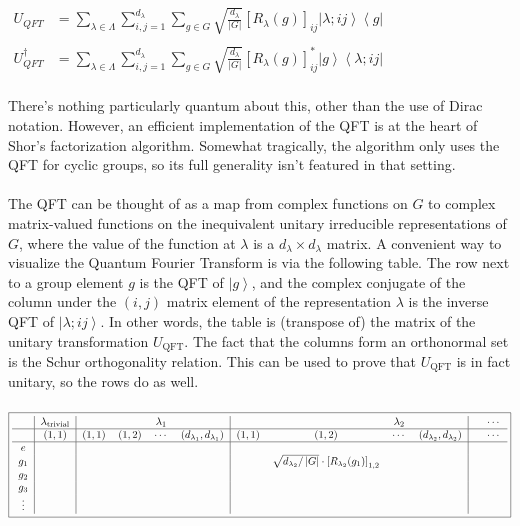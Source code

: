 \documentclass[]{article}
\begin{document}
\\
$\begin{aligned}
U_{QFT}&=\sum_{\lambda\in\Lambda}\sum_{i,j=1}^{d_\lambda}\sum_{g\in G}\sqrt{\frac{d_\lambda}{\left\vert G\right\vert}}\left[R_\lambda(g)\right]_{ij}\left\vert\lambda;ij\right\rangle\left\langle g\right\vert\\
\\
U_{QFT}^\dagger&=\sum_{\lambda\in\Lambda}\sum_{i,j=1}^{d_\lambda}\sum_{g\in G}\sqrt{\frac{d_\lambda}{\left\vert G\right\vert}}\left[R_\lambda(g)\right]_{ij}^*\left\vert g\right\rangle\left\langle \lambda;ij\right\vert
\end{aligned}$\\
\\
There's nothing particularly quantum about this, other than the use of Dirac notation. However, an efficient implementation of the QFT is at the heart of Shor's factorization algorithm. Somewhat tragically, the algorithm only uses the QFT for cyclic groups, so its full generality isn't featured in that setting.\\
\\
The QFT can be thought of as a map from complex functions on $G$ to complex matrix-valued functions on the inequivalent unitary irreducible representations of $G$, where the value of the function at $\lambda$ is a $d_\lambda\times d_\lambda$ matrix. A convenient way to visualize the Quantum Fourier Transform is via the following table. The row next to a group element $g$ is the QFT of $\left\vert g\right\rangle$, and the complex conjugate of the column under the $(i,j)$ matrix element of the representation $\lambda$ is the inverse QFT of $\left\vert \lambda;ij\right\rangle$. In other words, the table is (transpose of) the matrix of the unitary transformation $U_\text{QFT}$. The fact that the columns form an orthonormal set is the Schur orthogonality relation. This can be used to prove that $U_\text{QFT}$ is in fact unitary, so the rows do as well.\\
\\	
$\boxed{\begin{tabular}{c|c|cccc|cccc|cc}
 & $\lambda_{\text{trivial}}$ & &&$\lambda_1$ & &&&$\lambda_2$ &&& $\cdots$\\
 \hline
& $(1,1)$ & $(1,1)$ & $(1,2)$ & $\cdots$ & $(d_{\lambda_1},d_{\lambda_1})$ & $(1,1)$&$(1,2)$ &$\cdots$ & $(d_{\lambda_2},d_{\lambda_2})$& & $\cdots$\\
 \hline
$e$&&&&&&&&&&&\\
$g_1$&&&&&&&$\sqrt{d_{\lambda_2}/\left\vert G\right\vert}\cdot\left[R_{\lambda_2}(g_1)\right]_{1,2}$&&&&\\
$g_2$&&&&&&&&&&&\\
$g_3$&&&&&&&&&&&\\
$\vdots$&&&&&&&&&&&
\end{tabular}}$\\
\end{document}
